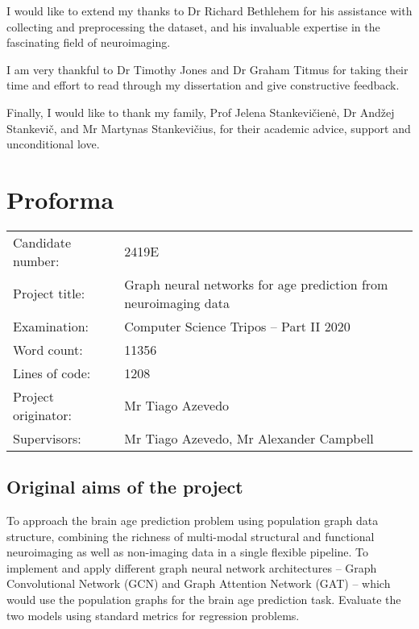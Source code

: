 I would like to extend my thanks to Dr Richard Bethlehem for his assistance with collecting and preprocessing the dataset, and his invaluable expertise in the fascinating field of neuroimaging.

I am very thankful to Dr Timothy Jones and Dr Graham Titmus for taking their time and effort to read through my dissertation and give constructive feedback.

Finally, I would like to thank my family, Prof Jelena Stankevičienė, Dr Andžej Stankevič, and Mr Martynas Stankevičius, for their academic advice, support and unconditional love.


\chapter*{Proforma}

\begin{tabular}{ll}
Candidate number:   & 2419E                  \\
Project title:      & Graph neural networks for age prediction from neuroimaging data \\
Examination:        & Computer Science Tripos -- Part II 2020 \\
Word count:         & 11356\footnotemark[1] \\
Lines of code:      & 1208  \\
Project originator: & Mr Tiago Azevedo                        \\
Supervisors:        & Mr Tiago Azevedo, Mr Alexander Campbell \\ 
\end{tabular}


\section*{Original aims of the project}

To approach the brain age prediction problem using population graph data structure, combining the richness of multi-modal structural and functional neuroimaging as well as non-imaging data in a single flexible pipeline.
To implement and apply different graph neural network architectures – Graph Convolutional Network (GCN) and Graph Attention Network (GAT) – which would use the population graphs for the brain age prediction task. Evaluate the two models using standard metrics for regression problems.

